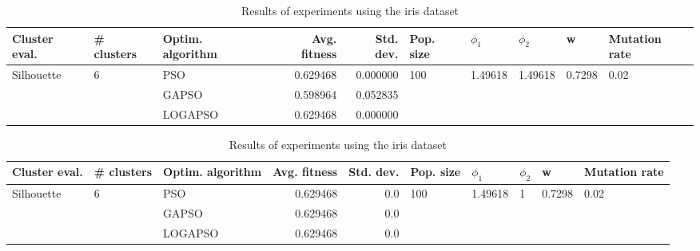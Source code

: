 \documentclass{article}
\begin{document}
\begin{table}
\centering
\caption{Results of experiments using the iris dataset}
\begin{tabular}{lllrrlllll}
\toprule
              Cluster eval. &        \# clusters & Optim. algorithm &  Avg. fitness &  Std. dev. &            Pop. size &               $\phi_{1}$ &               $\phi_{2}$ &                       w &         Mutation rate \\
\midrule
\multirow{3}{*}{Silhouette} & \multirow{3}{*}{6} &              PSO &      0.629468 &   0.000000 & \multirow{3}{*}{100} & \multirow{3}{*}{1.49618} & \multirow{3}{*}{1.49618} & \multirow{3}{*}{0.7298} & \multirow{3}{*}{0.02} \\
                            &                    &            GAPSO &      0.598964 &   0.052835 &                      &                          &                          &                         &                       \\
                            &                    &          LOGAPSO &      0.629468 &   0.000000 &                      &                          &                          &                         &                       \\
\bottomrule
\end{tabular}
\end{table}
\begin{table}
\centering
\caption{Results of experiments using the iris dataset}
\begin{tabular}{lllrrlllll}
\toprule
              Cluster eval. &        \# clusters & Optim. algorithm &  Avg. fitness &  Std. dev. &            Pop. size &               $\phi_{1}$ &         $\phi_{2}$ &                       w &         Mutation rate \\
\midrule
\multirow{3}{*}{Silhouette} & \multirow{3}{*}{6} &              PSO &      0.629468 &        0.0 & \multirow{3}{*}{100} & \multirow{3}{*}{1.49618} & \multirow{3}{*}{1} & \multirow{3}{*}{0.7298} & \multirow{3}{*}{0.02} \\
                            &                    &            GAPSO &      0.629468 &        0.0 &                      &                          &                    &                         &                       \\
                            &                    &          LOGAPSO &      0.629468 &        0.0 &                      &                          &                    &                         &                       \\
\bottomrule
\end{tabular}
\end{table}
\end{document}
